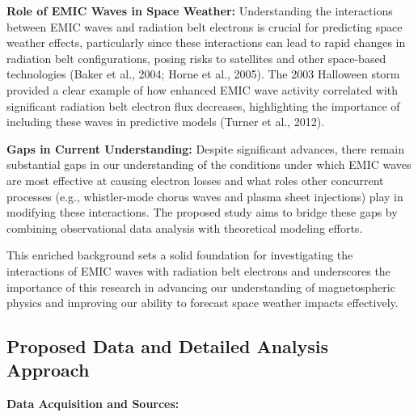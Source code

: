 \documentclass[
  letterpaper,
  DIV=11,
  numbers=noendperiod]{scrartcl}
\begin{document}
\textbf{Role of EMIC Waves in Space Weather:}
Understanding the interactions between EMIC waves and radiation belt electrons is crucial for predicting space weather effects, particularly since these interactions can lead to rapid changes in radiation belt configurations, posing risks to satellites and other space-based technologies (Baker et al., 2004; Horne et al., 2005). The 2003 Halloween storm provided a clear example of how enhanced EMIC wave activity correlated with significant radiation belt electron flux decreases, highlighting the importance of including these waves in predictive models (Turner et al., 2012).

\textbf{Gaps in Current Understanding:}
Despite significant advances, there remain substantial gaps in our understanding of the conditions under which EMIC waves are most effective at causing electron losses and what roles other concurrent processes (e.g., whistler-mode chorus waves and plasma sheet injections) play in modifying these interactions. The proposed study aims to bridge these gaps by combining observational data analysis with theoretical modeling efforts.

This enriched background sets a solid foundation for investigating the interactions of EMIC waves with radiation belt electrons and underscores the importance of this research in advancing our understanding of magnetospheric physics and improving our ability to forecast space weather impacts effectively.

\subsection{Proposed Data and Detailed Analysis Approach}\label{proposed-data-and-detailed-analysis-approach}

\textbf{Data Acquisition and Sources:}
\end{document}
